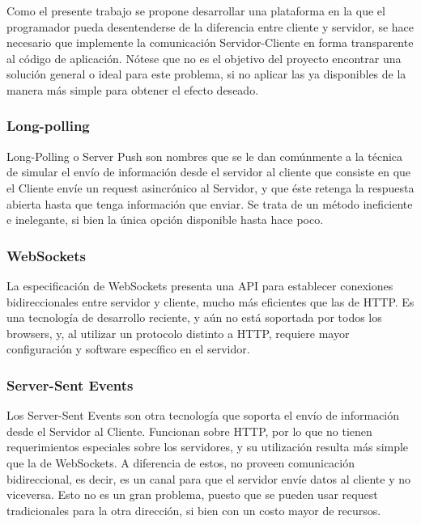\documentclass[doc,helv,longtable]{article}
\begin{document}
Como el presente trabajo se propone desarrollar una plataforma en la que el programador pueda desentenderse de la diferencia entre cliente y servidor, se hace necesario que implemente la comunicación Servidor-Cliente en forma transparente al código de aplicación. Nótese que no es el objetivo del proyecto encontrar una solución general o ideal para este problema, si no aplicar las ya disponibles de la manera más simple para obtener el efecto deseado.

\subsubsection{Long-polling}
Long-Polling o Server Push\cite{longpolling} son nombres que se le dan comúnmente a la técnica de simular el envío de información desde el servidor al cliente que consiste en que el Cliente envíe un request asincrónico al Servidor, y que éste retenga la respuesta abierta hasta que tenga información que enviar. Se trata de un método ineficiente e inelegante, si bien la única opción disponible hasta hace poco.

\subsubsection{WebSockets}
La especificación de WebSockets presenta una API para establecer conexiones bidireccionales entre servidor y cliente, mucho más eficientes que las de HTTP\cite{websockets}. Es una tecnología de desarrollo reciente, y aún no está soportada por todos los browsers, y, al utilizar un protocolo distinto a HTTP, requiere mayor configuración y software específico en el servidor.

\subsubsection{Server-Sent Events}
Los Server-Sent Events\cite{sse} son otra tecnología que soporta el envío de información desde el Servidor al Cliente. Funcionan sobre HTTP, por lo que no tienen requerimientos especiales sobre los servidores, y su utilización resulta más simple que la de WebSockets\cite{congress}\cite{wsvssse2}. A diferencia de estos, no proveen comunicación bidireccional, es decir, es un canal para que el servidor envíe datos al cliente y no viceversa. Esto no es un gran problema, puesto que se pueden usar request tradicionales para la otra dirección, si bien con un costo mayor de recursos\cite{ssedownside}.
\end{document}
